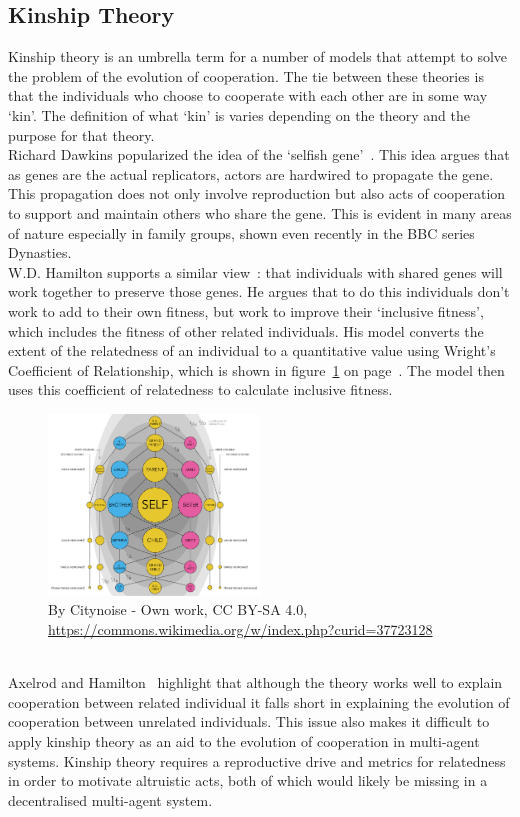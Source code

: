 \documentclass[twoside,twocolumn]{article}
\begin{document}
\subsection{Kinship Theory}
Kinship theory is an umbrella term for a number of models that attempt to solve the problem of the evolution of cooperation. The tie between these theories is that the individuals who choose to cooperate with each other are in some way `kin'. The definition of what `kin' is varies depending on the theory and the purpose for that theory.\\
Richard Dawkins popularized the idea of the `selfish gene'~\cite{selfish_gene}. This idea argues that as genes are the actual replicators, actors are hardwired to propagate the gene. This propagation does not only involve reproduction but also acts of cooperation to support and maintain others who share the gene. This is evident in many areas of nature especially in family groups, shown even recently in the BBC series Dynasties.\\
W.D. Hamilton supports a similar view~\cite{kinhamilton}: that individuals with shared genes will work together to preserve those genes. He argues that to do this individuals don't work to add to their own fitness, but work to improve their `inclusive fitness', which includes the fitness of other related individuals. His model converts the extent of the relatedness of an individual to a quantitative value using Wright's Coefficient of Relationship, which is shown in figure~\ref{fig:coefrelate} on page~\pageref{fig:coefrelate}. The model then uses this coefficient of relatedness to calculate inclusive fitness.
\begin{figure}
		\includegraphics[width=0.5\textwidth]{coefrelate.png}
	\caption{By Citynoise - Own work, CC BY-SA 4.0, \url{https://commons.wikimedia.org/w/index.php?curid=37723128}}
	\label{fig:coefrelate}
\end{figure}
\\ Axelrod and Hamilton~\cite{evolution_of_cooperation} highlight that although the theory works well to explain cooperation between related individual it falls short in explaining the evolution of cooperation between unrelated individuals. This issue also makes it difficult to apply kinship theory as an aid to the evolution of cooperation in multi-agent systems. Kinship theory requires a reproductive drive and metrics for relatedness in order to motivate altruistic acts, both of which would likely be missing in a decentralised multi-agent system.
\end{document}
